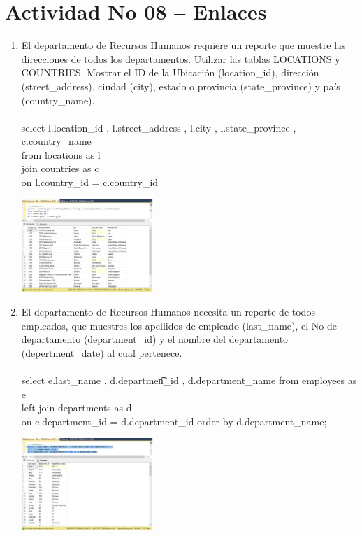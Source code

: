 \section{Actividad No 08 – Enlaces} 
		
\begin{enumerate}[1.]
	\item El departamento de Recursos Humanos requiere un reporte que muestre las direcciones de todos los departamentos. Utilizar las tablas LOCATIONS y COUNTRIES. Mostrar el ID de la Ubicación (location\_id), dirección (street\_address), ciudad (city), estado o provincia (state\_province) y país (country\_name). %
\\
\\select l.location\_id , l.street\_address , l.city , l.state\_province , c.country\_name \\
from locations as l \\
join countries as c \\
on l.country\_id = c.country\_id \\

	\begin{center}
	\includegraphics[width=5cm]{./Imagenes/8ejer1} 
	\end{center}


	\item El departamento de Recursos Humanos necesita un reporte de todos empleados, que muestres los apellidos de empleado (last\_name), el No de departamento (department\_id) y el nombre del departamento (depertment\_date) al cual pertenece. 
\\
\\select e.last\_name , d.departmen\t_id , d.department\_name from employees as e \\
left join departments as d \\
on e.department\_id = d.department\_id order by d.department\_name;\\

	\begin{center}
	\includegraphics[width=5cm]{./Imagenes/8ejer2} 
	\end{center}


\end{enumerate}
